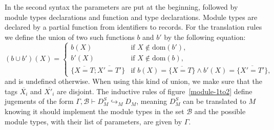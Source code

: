 \documentclass[a4paper,10pt]{article}
\begin{document}
In the second syntax the parameters are put at the beginning, followed by
module types declarations and function and type declarations. Module types are
declared by a partial function from identifiers to records. For the translation
rules we define the union of two such functions $b$ and $b'$ by the following
equation:
\[
(b \cup b')(X) = \begin{cases} b(X) & \text{if } X  \notin \text{dom}(b'),\\
  b'(X) & \text{if } X  \notin \text{dom}(b),\\
  \{\overline{X=T};\overline{X'=T'}\}& \text{if }
  b(X)=\{\overline{X=T}\} \wedge b'(X)=\{\overline{X'=T'}\},
\end{cases}
\]
and is undefined otherwise. When using this kind of union, we make sure that the
tags $\overline{X_i}$ and $\overline{X'_i}$ are disjoint. The inductive rules of
figure~\ref{module-1to2} define jugements of the form $\Gamma,\mathcal{B}\vdash
D_M^S\hookrightarrow_M D_M$, meaning $D_M^S$ can be translated to $M$ knowing it
should implement the module types in the set $\mathcal{B}$ and the possible
module types, with their list of parameters, are given by $\Gamma$.
\end{document}
